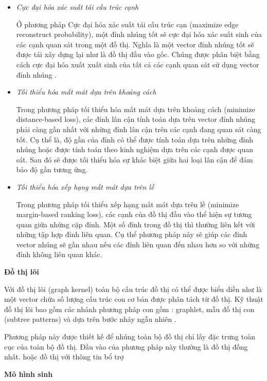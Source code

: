 \begin{itemize}
	\item \textit{Cực đại hóa xác suất tái cấu trúc cạnh }
	
	Ở phương pháp Cực đại hóa xác suất tái cấu trúc cạn (maximize edge reconstruct probability), một đỉnh nhúng tốt sẽ cực đại hóa xác suất sinh của các cạnh quan sát trong một đồ thị. Nghĩa là một vector đỉnh nhúng tốt sẽ được tái xây dựng lại như là đồ thị đầu vào gốc. Chúng được phân biệt bằng cách cực đại hóa xuất xuất sinh của tất cả các cạnh quan sát sử dụng vector đỉnh nhúng .
	
	\item \textit{Tối thiểu hóa mất mát dựa trên khoảng cách}
	
	Trong phương pháp tối thiểu hóa mất mát dựa trên khoảng cách (minimize distance-based loss), các đỉnh lân cận tính toán dựa trên vector đỉnh nhúng phải càng gần nhất với những đỉnh lân cận trên các cạnh đang quan sát càng tốt.
	Cụ thể là, độ gần của đỉnh có thể được tính toán dựa trên những đỉnh nhúng hoặc được tính toán theo kinh nghiệm dựa trên các cạnh được quan sát. Sau đó sẽ được tối thiểu hóa sự khác biệt giữa hai loại lân cận để đảm bảo độ gần tương ứng.
	
	\item \textit{Tối thiểu hóa xếp hạng mất mát dựa trên lề}
	
	Trong phương pháp tối thiểu xếp hạng mất mát dựa trên lề (minimize margin-based ranking loss), các cạnh của đồ thị đầu vào thể hiện sự tương quan giữa những cặp đỉnh. Một số đỉnh trong đồ thị thì thường liên kết với những tập hợp đỉnh liên quan. Cụ thể phương pháp này sẽ giúp các đỉnh vector nhúng sẽ gần nhau nếu các đỉnh liên quan đến nhau hơn so với những đỉnh không liên quan khác.
\end{itemize}

\textbf{Đồ thị lõi}

Với đồ thị lõi (graph kernel) toàn bộ cấu trúc đồ thị có thể được biểu diễn như là một vector chứa số lượng cấu trúc con cơ bản được phân tách từ đồ thị. Kỹ thuật đồ thị lõi bao gồm các nhánh phương pháp con gồm : graphlet, mẫu đồ thị con (subtree patterns) và dựa trên bước nhảy ngẫu nhiên .

Phương pháp này được thiết kế để nhúng toàn bộ đồ thị chỉ lấy đặc trưng toàn cục của toàn bộ đồ thị. Đầu vào của phương pháp này thường là đồ thị đồng nhất. hoặc đồ thị với thông tin bổ trợ

\textbf{Mô hình sinh}

